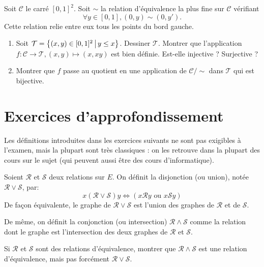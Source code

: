 \begin{exercice}
Soit $\mathcal C$ le \og carré\fg{} $[0,1]^2$. Soit $\sim$ la relation d'équivalence la plus fine sur $\mathcal C$ vérifiant
\[ \forall y\in [0,1], (0,y)\sim (0,y').\]
Cette relation relie entre eux tous les points du \og bord gauche\fg.
\begin{enumerate}
\item Soit $\mathcal T=\ensemble{(x,y)\in [0,1]^2}{y\leq x}$. Dessiner $\mathcal T$. Montrer que l'application $f : \mathcal C\to \mathcal T, (x,y)\mapsto (x,xy) $ est bien définie. Est-elle injective ? Surjective ? 
\item Montrer que $f$ passe au quotient en une application de $\mathcal C/\sim$ dans $\mathcal T$ qui est bijective.
\end{enumerate}
\end{exercice}





\section{Exercices d'approfondissement}


Les définitions introduites dans les exercices suivants ne sont pas exigibles à l'examen, mais la plupart sont très classiques : on les retrouve dans la plupart des cours sur le sujet (qui peuvent aussi être des cours d'informatique).

\begin{exercice}\label{exo-union-intersection-relations}
Soient $\mathcal R$ et $\mathcal S$ deux relations sur $E$. On définit la disjonction (ou union), notée $\mathcal R \vee \mathcal S$, par:
\[ x (\mathcal R \vee \mathcal S) y \iff (x \mathcal R y\text{ ou } x \mathcal S y)\]
De façon équivalente, le graphe de $\mathcal R \vee \mathcal S$ est l'union des graphes de $\mathcal R$ et de $\mathcal S$.

De même, on définit la conjonction (ou intersection) $\mathcal R \wedge \mathcal S$ comme la relation dont le graphe est l'intersection des deux graphes de $\mathcal R$ et $\mathcal S$.


Si $\mathcal R$ et $\mathcal S$ sont des relations d'équivalence, montrer que $\mathcal R \wedge \mathcal S$ est une relation d'équivalence, mais pas forcément $\mathcal R \vee \mathcal S$.
\end{exercice}

